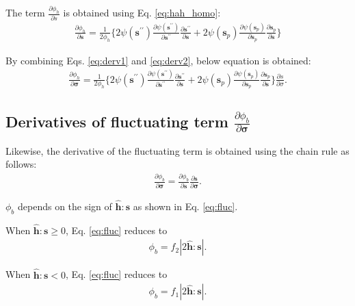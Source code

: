 \documentclass[12pt]{amsart}
\begin{document}
The term $\frac{\partial{\phi_h}  }{\partial{s}} $ is obtained using Eq. \ref{eq:hah_homo}:
\begin{eqnarray}
  \label{eq:derv2}
  \frac{\partial{\phi_h}  }{\partial{\mathbf{s}}} = \frac{1}{2\phi_h}\bigg\{ 2\psi(\mathbf{s}^{\prime\prime})\frac{\partial{\psi(\mathbf{s}^{\prime\prime})}}{\partial{\mathbf{s}^{\prime\prime}}}  \frac{\partial\mathbf{s}^{\prime\prime}}{\partial \mathbf{s}}  +  2\psi(\mathbf{s}_p) \frac{\partial{\psi(\mathbf{s}_p)}}{\partial{\mathbf{s}_p}} \frac{\partial{\mathbf{s}_p}}{\partial{\mathbf{s}}}\bigg\}
\end{eqnarray}

By combining Eqs. \ref{eq:derv1} and \ref{eq:derv2}, below equation is obtained:
\begin{eqnarray}
  \label{eq:derv3}
  \frac{\partial{\phi_h}  }{\partial{\mathbf{\sigma}}} = \frac{1}{2\phi_h}\bigg\{  2\psi(\mathbf{s}^{\prime\prime})\frac{\partial{\psi(\mathbf{s}^{\prime\prime})}}{\partial{\mathbf{s}^{\prime\prime}}}  \frac{\partial\mathbf{s}^{\prime\prime}}{\partial \mathbf{s}} + 2\psi(\mathbf{s}_p) \frac{\partial{\psi(\mathbf{s}_p)}}{\partial{\mathbf{s}_p}} \frac{\partial{\mathbf{s}_p}}{\partial{\mathbf{s}}}\bigg\} \frac{\partial{s}}{\partial{\sigma}}.
\end{eqnarray}


\subsection{Derivatives of fluctuating term $\frac{\partial{\phi_b}  }{\partial{\mathbf{\sigma}}}$}
\label{sec:2.2}


Likewise, the derivative of the fluctuating term is obtained using the chain rule as follows:
\begin{eqnarray}
  \label{eq:derv4}
  \frac{\partial{\phi_b}  }{\partial{\mathbf{\sigma}}}  =   \frac{\partial{\phi_b}}{\partial{\mathbf{s}}} \frac{\partial{\mathbf{s}}}{\partial{\mathbf{\sigma}}}.
\end{eqnarray}

$\phi_b$ depends on the sign of $\hat{\mathbf{h}}:\mathbf{s}$ as shown in Eq. \ref{eq:fluc}.

When $\hat{\mathbf{h}}:\mathbf{s}\ge0$, Eq. \ref{eq:fluc} reduces to
\begin{eqnarray}
    \label{eq:fluc1}
\phi_b  =f_2|2\hat{\mathbf{h}}:\mathbf{s}|.
\end{eqnarray}


When $\hat{\mathbf{h}}:\mathbf{s}<0$, Eq. \ref{eq:fluc} reduces to
\begin{eqnarray}
    \label{eq:fluc1}
\phi_b  =f_1|2\hat{\mathbf{h}}:\mathbf{s}|.
\end{eqnarray}
\end{document}

